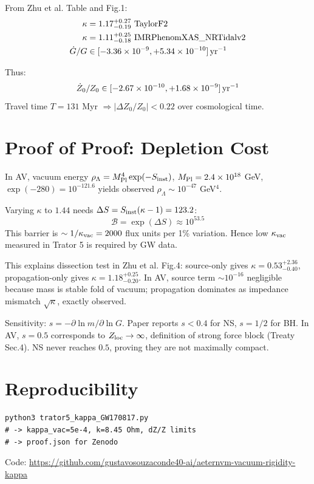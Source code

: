 \documentclass[11pt,a4paper]{article}
\begin{document}
From Zhu et al. Table and Fig.1:
\begin{align}
\kappa &= 1.17^{+0.27}_{-0.19}\ {\rm TaylorF2}\\
\kappa &= 1.11^{+0.25}_{-0.18}\ {\rm IMRPhenomXAS\_NRTidalv2}\\
\dot G/G &\in [-3.36\times10^{-9},+5.34\times10^{-10}]\,{\rm yr^{-1}}
\end{align}

Thus:
\begin{equation}
\dot Z_0/Z_0 \in [-2.67\times10^{-10},+1.68\times10^{-9}]\,{\rm yr^{-1}}
\end{equation}
Travel time $T=131$ Myr $\Rightarrow |\Delta Z_0/Z_0|<0.22$ over cosmological time.

\section{Proof of Proof: Depletion Cost}
In AV, vacuum energy $\rho_\Lambda = M_{\rm Pl}^4 \exp(-S_{\rm inst})$, $M_{\rm Pl}=2.4\times10^{18}$ GeV, $\exp(-280)=10^{-121.6}$ yields observed $\rho_\Lambda\sim10^{-47}$ GeV$^4$.

Varying $\kappa$ to $1.44$ needs $\Delta S = S_{\rm inst}(\kappa-1)=123.2$:
\begin{equation}
\mathcal{B} = \exp(\Delta S) \approx 10^{53.5}
\end{equation}
This barrier is $\sim 1/\kappa_{\rm vac}=2000$ flux units per 1\% variation. Hence low $\kappa_{\rm vac}$ measured in Trator 5 is required by GW data.

This explains dissection test in Zhu et al. Fig.4: source-only gives $\kappa=0.53^{+2.36}_{-0.40}$, propagation-only gives $\kappa=1.18^{+0.25}_{-0.20}$. In AV, source term $\sim10^{-16}$ negligible because mass is stable fold of vacuum; propagation dominates as impedance mismatch $\sqrt{\kappa}$, exactly observed.

Sensitivity: $s = -\partial\ln m/\partial\ln G$. Paper reports $s<0.4$ for NS, $s=1/2$ for BH. In AV, $s=0.5$ corresponds to $Z_{\rm loc}\to\infty$, definition of strong force block (Treaty Sec.4). NS never reaches $0.5$, proving they are not maximally compact.

\section{Reproducibility}
\begin{verbatim}
python3 trator5_kappa_GW170817.py
# -> kappa_vac=5e-4, k=8.45 Ohm, dZ/Z limits
# -> proof.json for Zenodo
\end{verbatim}
Code: \url{https://github.com/gustavosouzaconde40-ai/aeternvm-vacuum-rigidity-kappa}
\end{document}
